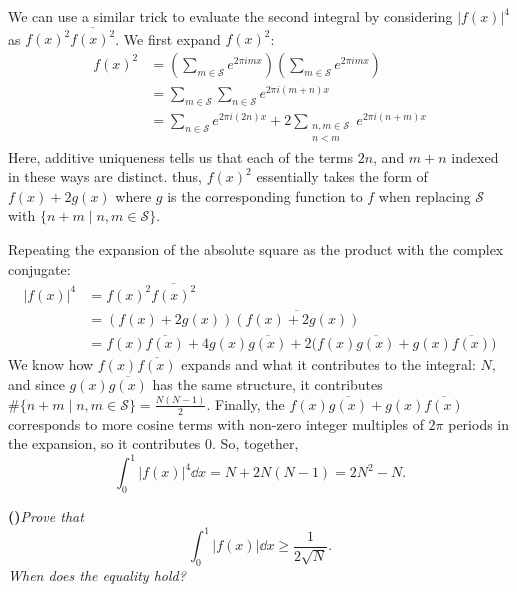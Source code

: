 \documentclass{amsart}
\newcommand{\calS}{\mathcal{S}}
\newcounter{qpart}
\newcommand{\qpart}[1]{%
  \stepcounter{qpart}%
  \bigskip\noindent\textbf{(\alph{qpart})}\quad\textit{#1}\par\bigskip%
}
\begin{document}
\noindent
We can use a similar trick to evaluate the second integral by considering $|f(x)|^4$ as $f(x)^2 \overline{f(x)^2}$. We first expand $f(x)^2$:
\begin{align*}
    f(x)^2 &= \left(\sum_{m \in \calS} e^{2\pi imx}\right)\left(\sum_{m \in \calS} e^{2\pi imx}\right) \\
           &= \sum_{m \in \calS} \sum_{n \in \calS} e^{2\pi i(m+n)x} \\
           &= \sum_{n \in \calS} e^{2\pi i(2n)x} + 2\sum_{\substack{n,m \in \calS \\ n < m}} e^{2\pi i(n + m)x}
\end{align*}
Here, additive uniqueness tells us that each of the terms $2n$, and $m + n$ indexed in these ways are distinct. thus, $f(x)^2$ essentially takes the form of $f(x) + 2g(x)$ where $g$ is the corresponding function to $f$ when replacing $\calS$ with $\{ n + m \mid n,m \in \calS \}$.

\bigskip\noindent
Repeating the expansion of the absolute square as the product with the complex conjugate:
\begin{align*}
    |f(x)|^4 &= f(x)^2 \overline{f(x)^2} \\
             &= (f(x) + 2g(x))\overline{(f(x) + 2g(x))} \\
             &= f(x)\overline{f(x)} + 4g(x)\overline{g(x)} + 2\bigg(f(x)\overline{g(x)} + g(x)\overline{f(x)}\bigg)
\end{align*}
We know how $f(x)\overline{f(x)}$ expands and what it contributes to the integral: $N$, and since $g(x)\overline{g(x)}$ has the same structure, it contributes $\# \{n + m \mid n, m \in \calS \} = \frac{N(N-1)}{2}$.
Finally, the $f(x)\overline{g(x)} + g(x)\overline{f(x)}$ corresponds to more cosine terms with non-zero integer multiples of $2\pi$ periods in the expansion, so it contributes 0.
So, together,
\begin{equation*}
    \int_0^1 |f(x)|^4 \dd{x} = N + 2N(N-1) = 2N^2 - N.
\end{equation*}

\qpart{Prove that \begin{equation*} \int_0^1 |f(x)| \dd{x} \ge \frac{1}{2\sqrt{N}}.\end{equation*} When does the equality hold?}
\end{document}
